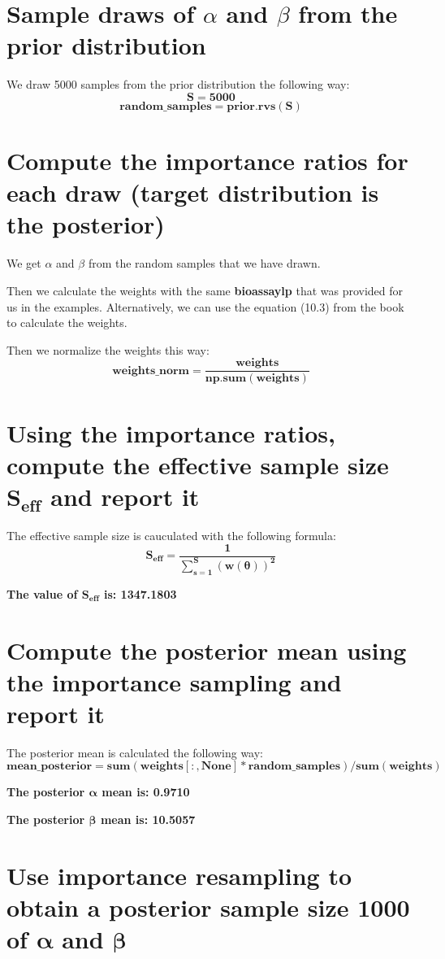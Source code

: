 \documentclass[17pt]{article}
\begin{document}
\section{Sample draws of $ \alpha $ and $ \beta $ from the prior distribution} 
We draw 5000 samples from the prior distribution the following way:
$$ \mathbf{S = 5000} $$
$$ \mathbf{random\_samples = prior.rvs(S)} $$


\section{Compute the importance ratios for each draw (target distribution is the posterior)}
We get $\alpha$ and $\beta$ from the random samples that we have drawn.

Then we calculate the weights with the same \textbf{bioassaylp} that was provided for us in the examples. Alternatively, we can use the equation (10.3) from the book to calculate the weights.

Then we normalize the weights this way:
$$ \mathbf{weights\_norm = \frac{weights}{np.sum(weights)}} $$


\section{Using the importance ratios, compute the effective sample size $\mathbf{S_{eff}}$ and report it}

The effective sample size is cauculated with the following formula:
$$ \mathbf{S_{eff} = \frac{1}{\sum_{s=1}^S(w(\theta))^2}} $$

\textbf{The value of $ \mathbf{S_{eff}}$ is: 1347.1803}


\section{Compute the posterior mean using the importance sampling and report it}

The posterior mean is calculated the following way:
$$ \mathbf{mean\_posterior = sum(weights[:,None] * random\_samples) / sum(weights)} $$

\textbf{The posterior $\mathbf{\alpha}$ mean is: 0.9710}

\textbf{The posterior $\mathbf{\beta}$ mean is: 10.5057}


\section{Use importance resampling to obtain a posterior sample size 1000 of $\mathbf{\alpha}$ and $\mathbf{\beta}$}
\end{document}
